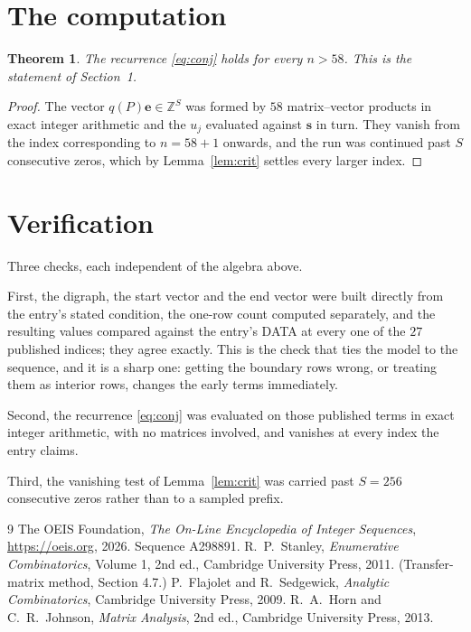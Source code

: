 \documentclass[11pt,a4paper]{article}
\theoremstyle{plain}
\newtheorem{theorem}{Theorem}
\theoremstyle{definition}
\begin{document}
\section{The computation}

\begin{theorem}
The recurrence \eqref{eq:conj} holds for every $n>58$. This is the statement of
Section~1.
\end{theorem}

\begin{proof}
The vector $q(P)\mathbf{e}\in\mathbb{Z}^{S}$ was formed by $58$ matrix--vector
products in exact integer arithmetic and the $u_j$ evaluated against $\mathbf{s}$ in turn.
They vanish from the index corresponding to $n=58+1$ onwards, and the run was continued
past $S$ consecutive zeros, which by Lemma~\ref{lem:crit} settles every larger index.
\end{proof}

\section{Verification}

Three checks, each independent of the algebra above.

First, the digraph, the start vector and the end vector were built directly from the
entry's stated condition, the one-row count computed separately, and the resulting values
compared against the entry's DATA at every one of the $27$ published indices; they
agree exactly. This is the check that ties the model to the sequence, and it is a sharp one:
getting the boundary rows wrong, or treating them as interior rows, changes the early terms
immediately.

Second, the recurrence \eqref{eq:conj} was evaluated on those published terms in exact
integer arithmetic, with no matrices involved, and vanishes at every index the entry claims.

Third, the vanishing test of Lemma~\ref{lem:crit} was carried past $S=256$ consecutive
zeros rather than to a sampled prefix.

\begin{thebibliography}{9}
 The OEIS Foundation, \emph{The On-Line Encyclopedia of Integer
Sequences}, \url{https://oeis.org}, 2026. Sequence A298891.
 R.~P.~Stanley, \emph{Enumerative Combinatorics}, Volume 1, 2nd ed.,
Cambridge University Press, 2011. (Transfer-matrix method, Section 4.7.)
 P.~Flajolet and R.~Sedgewick, \emph{Analytic Combinatorics}, Cambridge
University Press, 2009.
 R.~A.~Horn and C.~R.~Johnson, \emph{Matrix Analysis}, 2nd ed., Cambridge
University Press, 2013.
\end{thebibliography}
\end{document}
